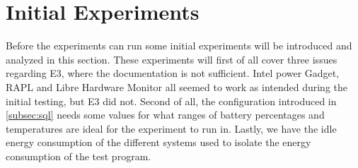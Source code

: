 \section{Initial Experiments}

Before the experiments can run some initial experiments will be introduced and analyzed in this section. These experiments will first of all cover three issues regarding E3, where the documentation is not sufficient. Intel power Gadget, RAPL and Libre Hardware Monitor all seemed to work as intended during the initial testing, but E3 did not. Second of all, the configuration introduced in \cref{subsec:sql} needs some values for what ranges of battery percentages and temperatures are ideal for the experiment to run in. Lastly, we have the idle energy consumption of the different systems used to isolate the energy consumption of the test program. 



